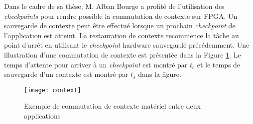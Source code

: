 Dans le cadre de sa thèse, M. Alban Bourge a profité de l'utilisation des \emph{checkpoints} pour rendre possible
la commutation de contexte sur FPGA. Un sauvegarde de contexte peut être effectué lorsque un prochain \emph{checkpoint}
de l'application est atteint. La restauration de contexte recommence la tâche au point d'arrêt en utilisant
le \emph{checkpoint} hardware sauvegardé précédemment. Une illustration d'une commutation de contexte est présentée
dans la Figure \ref{fig:switch}. Le temps d'attente pour arriver à un \emph{checkpoint} est montré par $t_c$ et le temps
de sauvegarde d'un contexte est montré par $t_s$ dans la figure.

\begin{figure}[h]
	\centering
	\texttt{[image: context]}
	\caption{Exemple de commutation de contexte matériel entre deux applications\cite{Bourge2015}}
	\label{fig:switch}
	\vspace{-2mm}
\end{figure}

